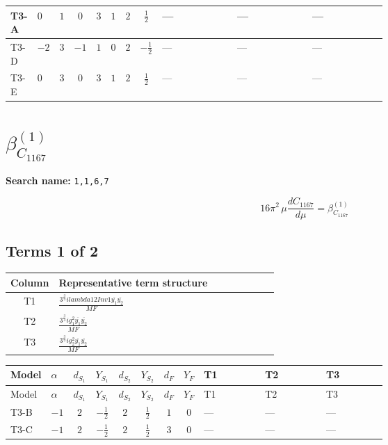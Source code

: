 \documentclass[8pt]{article}
\begin{document}
\begin{landscape}
\begin{longtable}{@{}llcccccc >{\raggedright\arraybackslash}p{0.21\linewidth} >{\raggedright\arraybackslash}p{0.21\linewidth} >{\raggedright\arraybackslash}p{0.21\linewidth}@{}}
\midrule
T3-A & $0$ & $1$ & $0$ & $3$ & $1$ & $2$ & $\frac{1}{2}$ & --- & --- & --- \\
\midrule
T3-D & $-2$ & $3$ & $-1$ & $1$ & $0$ & $2$ & $-\frac{1}{2}$ & --- & --- & --- \\
\midrule
T3-E & $0$ & $3$ & $0$ & $3$ & $1$ & $2$ & $\frac{1}{2}$ & --- & --- & --- \\
\midrule
\bottomrule
\end{longtable}
\clearpage
\section*{$\beta_{C_{1167}}^{(1)}$}
\noindent\textbf{Search name: }\texttt{1,1,6,7}\par\smallskip
\[16\pi^2\,\mu\frac{d C_{1167}}{d\mu}=\beta_{C_{1167}}^{(1)}\]
\subsection*{Terms 1 of 2}
\begin{center}
\begin{tabular}{@{}c >{\raggedright\arraybackslash}p{0.82\linewidth}@{}}
\toprule
Column & Representative term structure \\
\midrule
T1 & \(\displaystyle \frac{3^{\frac{3}{4}} i lambda12Inv1 \overline{y_{1}} \overline{y_{2}}}{MF}\) \\
\midrule
T2 & \(\displaystyle \frac{3^{\frac{3}{4}} i g_{1}^{2} \overline{y_{1}} \overline{y_{2}}}{MF}\) \\
\midrule
T3 & \(\displaystyle \frac{3^{\frac{3}{4}} i g_{2}^{2} \overline{y_{1}} \overline{y_{2}}}{MF}\) \\
\midrule
\bottomrule
\end{tabular}
\end{center}
\smallskip
\tiny
\begin{longtable}{@{}llcccccc >{\raggedright\arraybackslash}p{0.21\linewidth} >{\raggedright\arraybackslash}p{0.21\linewidth} >{\raggedright\arraybackslash}p{0.21\linewidth}@{}}
\toprule
Model & $\alpha$ & $d_{S_1}$ & $Y_{S_1}$ & $d_{S_2}$ & $Y_{S_2}$ & $d_F$ & $Y_F$ & T1 & T2 & T3 \\
\midrule
\endfirsthead
\toprule
Model & $\alpha$ & $d_{S_1}$ & $Y_{S_1}$ & $d_{S_2}$ & $Y_{S_2}$ & $d_F$ & $Y_F$ & T1 & T2 & T3 \\
\midrule
\endhead
T3-B & $-1$ & $2$ & $-\frac{1}{2}$ & $2$ & $\frac{1}{2}$ & $1$ & $0$ & --- & --- & --- \\
\midrule
T3-C & $-1$ & $2$ & $-\frac{1}{2}$ & $2$ & $\frac{1}{2}$ & $3$ & $0$ & --- & --- & --- \\

\end{longtable}
\end{landscape}
\end{document}
